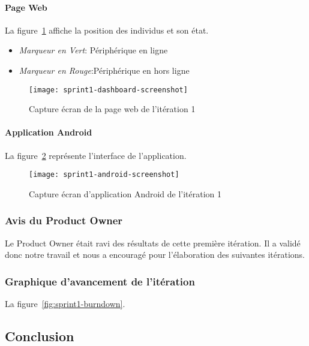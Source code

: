 \paragraph{Page Web }

La figure~\ref{fig:sprint1-dashboard-screenshot} affiche la position des
individus et son état.
\begin{itemize}
 \item \textit{Marqueur en Vert}: Périphérique en ligne
 \item \textit{Marqueur en Rouge}:Périphérique en hors ligne
\end{itemize}

\begin{figure}[htbp]
    \centering
    \texttt{[image: sprint1-dashboard-screenshot]}
    \caption{Capture écran de la page web de l'itération 1}
    \label{fig:sprint1-dashboard-screenshot}
\end{figure}

\paragraph{Application Android}

La figure~\ref{fig:sprint1-android-screenshot} représente l'interface de
l'application.

\begin{figure}[htbp]
    \centering
    \texttt{[image: sprint1-android-screenshot]}
    \caption{Capture écran d'application Android de l'itération 1}
    \label{fig:sprint1-android-screenshot}
\end{figure}

\subsubsection{Avis du Product Owner}

Le Product Owner était ravi des résultats de cette première itération. Il a
validé donc notre travail et nous a encouragé pour l'élaboration des suivantes
itérations.

\subsubsection{Graphique d'avancement de l'itération}

La figure~\ref{fig:sprint1-burndown}.


\subsection{Conclusion}

